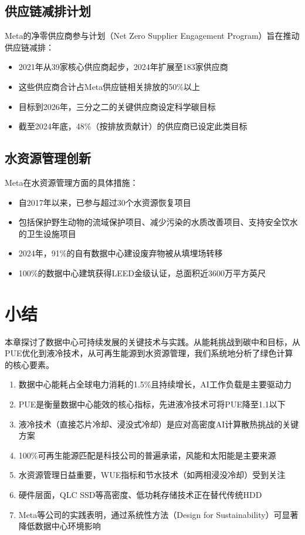 \subsection{供应链减排计划}

Meta的净零供应商参与计划（Net Zero Supplier Engagement Program）旨在推动供应链减排：
\begin{itemize}
    \item 2021年从39家核心供应商起步，2024年扩展至183家供应商
    \item 这些供应商合计占Meta供应链相关排放的50\%以上
    \item 目标到2026年，三分之二的关键供应商设定科学碳目标
    \item 截至2024年底，48\%（按排放贡献计）的供应商已设定此类目标
\end{itemize}

\subsection{水资源管理创新}

Meta在水资源管理方面的具体措施：
\begin{itemize}
    \item 自2017年以来，已参与超过30个水资源恢复项目
    \item 包括保护野生动物的流域保护项目、减少污染的水质改善项目、支持安全饮水的卫生设施项目
    \item 2024年，91\%的自有数据中心建设废弃物被从填埋场转移
    \item 100\%的数据中心建筑获得LEED金级认证，总面积近3600万平方英尺
\end{itemize}

\section{小结}\label{sec:green-summary}

本章探讨了数据中心可持续发展的关键技术与实践。从能耗挑战到碳中和目标，从PUE优化到液冷技术，从可再生能源到水资源管理，我们系统地分析了绿色计算的核心要素。

\begin{keypoints}
\begin{enumerate}
    \item 数据中心能耗占全球电力消耗的1.5\%且持续增长，AI工作负载是主要驱动力
    \item PUE是衡量数据中心能效的核心指标，先进液冷技术可将PUE降至1.1以下
    \item 液冷技术（直接芯片冷却、浸没式冷却）是应对高密度AI计算散热挑战的关键方案
    \item 100\%可再生能源匹配是科技公司的普遍承诺，风能和太阳能是主要来源
    \item 水资源管理日益重要，WUE指标和节水技术（如两相浸没冷却）受到关注
    \item 硬件层面，QLC SSD等高密度、低功耗存储技术正在替代传统HDD
    \item Meta等公司的实践表明，通过系统性方法（Design for Sustainability）可显著降低数据中心环境影响
\end{enumerate}
\end{keypoints}

